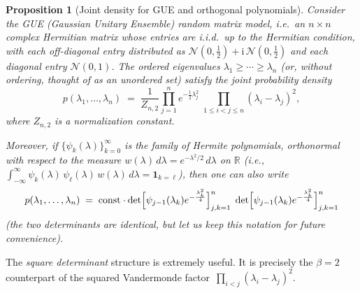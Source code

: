 \documentclass[letterpaper,11pt,oneside,reqno]{book}
\numberwithin{equation}{chapter}  %
\newtheorem{proposition}{Proposition}[chapter]  %
\theoremstyle{definition}
\begin{document}
\begin{proposition}[Joint density for GUE and orthogonal polynomials]
  \label{lecture4:prop:gue-joint-density}
  Consider the GUE (Gaussian Unitary Ensemble) random matrix model, i.e.\ an
  \(n\times n\) complex Hermitian matrix whose entries
  are i.i.d.\ up to the Hermitian condition, with each
  off-diagonal entry distributed as
  \(\mathcal{N}(0,\tfrac12)+\mathrm{i}\,\mathcal{N}(0,\tfrac12)\)
  and each diagonal entry \(\mathcal{N}(0,1)\).
  The ordered eigenvalues \(\lambda_1 \ge \cdots \ge \lambda_n\)
  (or, without ordering, thought of as an unordered set)
  satisfy the joint probability density
  \begin{equation}
  	\label{lecture4:eq:gue-joint-density}
    p(\lambda_1,\ldots,\lambda_n)
    \;=\;
    \frac{1}{Z_{n,2}}
    \prod_{j=1}^n e^{-\frac12 \lambda_j^2}
    \;\prod_{1\le i<j\le n} (\lambda_i - \lambda_j)^2,
  \end{equation}
  where \(Z_{n,2}\) is a normalization constant.

	Moreover, if
  \(\{\psi_k(\lambda)\}_{k=0}^\infty\)
	is the family of Hermite polynomials, orthonormal
  with respect to the measure
  \(w(\lambda)\,d\lambda = e^{-\lambda^2/2}\,d\lambda\)
  on \(\mathbb{R}\) (i.e.,
	\(\displaystyle\int_{-\infty}^{\infty} \psi_k(\lambda)\,\psi_\ell(\lambda)\,w(\lambda)\,d\lambda = \mathbf{1}_{k=\ell}\)),
  then one can also write
  \begin{equation}
  	\label{lecture4:eq:gue-joint-OP}
    p(\lambda_1,\ldots,\lambda_n)
    \;=\;
		\mathrm{const}\cdot
		\det\Bigl[\psi_{j-1}(\lambda_k)e^{-\frac{\lambda_k^2}{4}}\Bigr]_{j,k=1}^n
		\;\det\Bigl[\psi_{j-1}(\lambda_k)e^{-\frac{\lambda_k^2}{4}}\Bigr]_{j,k=1}^n
  \end{equation}
	(the two determinants are identical, but let us keep this notation for future convenience).
\end{proposition}
The \emph{square determinant} structure is extremely useful.
It is
precisely the \(\beta=2\) counterpart
of the squared Vandermonde factor
\(\,\prod_{i<j}(\lambda_i-\lambda_j)^2\).
\end{document}
